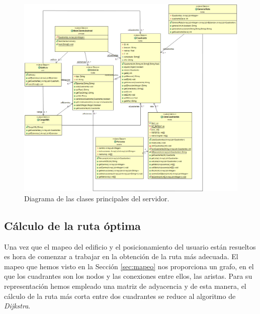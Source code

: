 \begin{figure}[t]
	\centering
	\includegraphics[width=1.1\textwidth]{Imagenes/Capitulo4/diagramServer}
	\caption{Diagrama de las clases principales del servidor.}
	\label{fig:diagServ}
\end{figure}


\subsection{Cálculo de la ruta óptima}
\label{rutaEInst}

Una vez que el mapeo del edificio y el posicionamiento del usuario están resueltos es hora de comenzar a trabajar en la obtención de la ruta más adecuada. El mapeo que hemos visto en la Sección \ref{sec:mapeo} nos proporciona un grafo, en el que los cuadrantes son los nodos y las conexiones entre ellos, las aristas. Para su representación hemos empleado una matriz de adyacencia y de esta manera, el cálculo de la ruta más corta entre dos cuadrantes se reduce al algoritmo de \textit{Dijkstra}.

